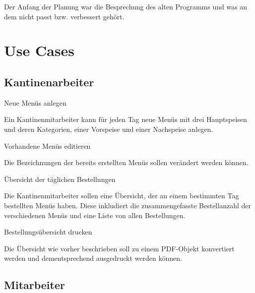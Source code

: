 \author{Benjamin Besic}
Der Anfang der Planung war die Besprechung des alten Programms und was an dem nicht passt bzw. verbessert gehört.

\section{Use Cases}

\subsection{Kantinenarbeiter}

\begin{compactitem}
    \item Neue Menüs anlegen
    \begin{compactitem}
        \item Ein Kantinenmitarbeiter kann für jeden Tag neue Menüs mit drei Hauptspeisen und deren Kategorien, einer Vorspeise und einer Nachspeise anlegen.
    \end{compactitem}
    \item Vorhandene Menüs editieren
    \begin{compactitem}
        \item Die Bezeichnungen der bereits erstellten Menüs sollen verändert werden können.
    \end{compactitem}
    \item Übersicht der täglichen Bestellungen
    \begin{compactitem}
        \item Die Kantinenmitarbeiter sollen eine Übersicht, der an einem bestimmten Tag bestellten Menüs haben. Diese inkludiert die zusammengefasste Bestellanzahl der verschiedenen Menüs und eine Liste von allen Bestellungen.
    \end{compactitem}
    \item Bestellungsübersicht drucken
    \begin{compactitem}
        \item Die Übersicht wie vorher beschrieben soll zu einem PDF-Objekt konvertiert werden und dementsprechend ausgedruckt werden können.
    \end{compactitem}
\end{compactitem}

\subsection{Mitarbeiter}

